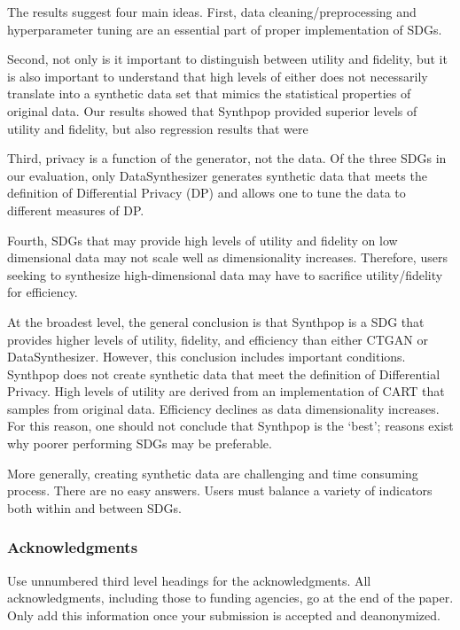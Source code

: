 \documentclass[runningheads]{llncs}
\begin{document}
The results suggest four main ideas.  First, data cleaning/preprocessing and hyperparameter tuning are an essential part of proper implementation of SDGs.   

Second, not only is it important to distinguish between utility and fidelity, but it is also important to understand that high levels of either does not necessarily translate into a synthetic data set that mimics the statistical properties of original data.  Our results showed that Synthpop provided superior levels of utility and fidelity, but also regression results that were 

Third, privacy is a function of the generator, not the data.  Of the three SDGs in our evaluation, only DataSynthesizer generates synthetic data that meets the definition of Differential Privacy (DP) and allows one to tune the data to different measures of DP.

Fourth, SDGs that may provide high levels of utility and fidelity on low dimensional data may not scale well as dimensionality increases.  Therefore, users seeking to synthesize high-dimensional data may have to sacrifice utility/fidelity for efficiency.

At the broadest level, the general conclusion is that Synthpop is a SDG that provides higher levels of utility, fidelity, and efficiency than either CTGAN or DataSynthesizer.  However, this conclusion includes important conditions.  Synthpop does not create synthetic data that meet the definition of Differential Privacy.  High levels of utility are derived from an implementation of CART that samples from original data.  Efficiency declines as data dimensionality increases.  For this reason, one should not conclude that Synthpop is the `best'; reasons exist why poorer performing SDGs may be preferable.

More generally, creating synthetic data are challenging and time consuming process.  There are no easy answers.  Users must balance a variety of indicators both within and between SDGs.  



\subsubsection*{Acknowledgments}
Use unnumbered third level headings for the acknowledgments. All acknowledgments, including those to funding agencies, go at the end of the paper. Only add this information once your submission is accepted and deanonymized. 

\clearpage


\clearpage


\clearpage



\clearpage
\appendix

\end{document}
